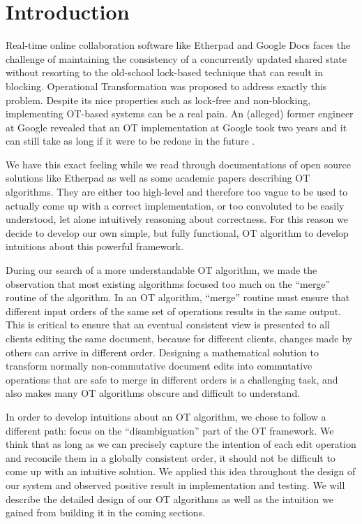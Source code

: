 \section{Introduction}

Real-time online collaboration software like Etherpad and Google Docs faces the challenge of
maintaining the consistency of a concurrently updated shared state without resorting to the
old-school lock-based technique that can result in blocking. Operational Transformation \cite{xxx}
was proposed to address exactly this problem. Despite its nice properties such as lock-free and
non-blocking, implementing OT-based systems can be a real pain. An (alleged) former engineer at
Google revealed that an OT implementation at Google took two years and it can still take as long if
it were to be redone in the future \cite{xxx}.

We have this exact feeling while we read through documentations of open source solutions like
Etherpad as well as some academic papers describing OT algorithms. They are either too high-level
and therefore too vague to be used to actually come up with a correct implementation, or too
convoluted to be easily understood, let alone intuitively reasoning about correctness. For this
reason we decide to develop our own simple, but fully functional, OT algorithm to develop intuitions
about this powerful framework.

During our search of a more understandable OT algorithm, we made the observation that most existing
algorithms focused too much on the ``merge'' routine of the algorithm. In an OT algorithm, ``merge''
routine must ensure that different input orders of the same set of operations results in the same
output. This is critical to ensure that an eventual consistent view is presented to all clients
editing the same document, because for different clients, changes made by others can arrive in
different order. Designing a mathematical solution to transform normally non-commutative document
edits into commutative operations that are safe to merge in different orders is a challenging task,
and also makes many OT algorithms obscure and difficult to understand.

In order to develop intuitions about an OT algorithm, we chose to follow a different path: focus on
the ``disambiguation'' part of the OT framework. We think that as long as we can precisely capture
the intention of each edit operation and reconcile them in a globally consistent order, it should
not be difficult to come up with an intuitive solution. We applied this idea throughout the design
of our system and observed positive result in implementation and testing. We will describe the
detailed design of our OT algorithms as well as the intuition we gained from building it in the
coming sections.
